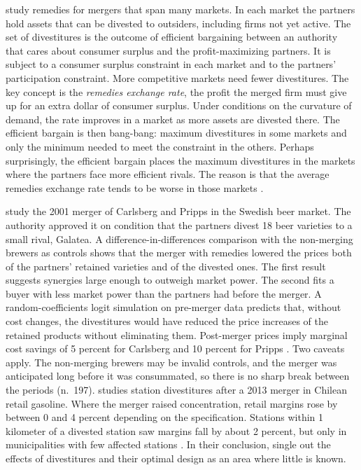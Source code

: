 \citet{NockeRhodes2019} study remedies for mergers that span many markets. In each market the partners hold assets
that can be divested to outsiders, including firms not yet active. The set of divestitures is the outcome of efficient
bargaining between an authority that cares about consumer surplus and the profit-maximizing partners. It is subject to
a consumer surplus constraint in each market and to the partners' participation constraint. More competitive markets
need fewer divestitures. The key concept is the \emph{remedies exchange rate}, the profit the merged firm must give up
for an extra dollar of consumer surplus. Under conditions on the curvature of demand, the rate improves in a market as
more assets are divested there. The efficient bargain is then bang-bang: maximum divestitures in some markets and only
the minimum needed to meet the constraint in the others. Perhaps surprisingly, the efficient bargain places the
maximum divestitures in the markets where the partners face more efficient rivals. The reason is that the average
remedies exchange rate tends to be worse in those markets \citep[p.~254]{AskerNocke2021}.

\citet{FribergRomahn2015} study the 2001 merger of Carlsberg and Pripps in the Swedish beer market. The authority
approved it on condition that the partners divest 18 beer varieties to a small rival, Galatea. A
difference-in-differences comparison with the non-merging brewers as controls shows that the merger with remedies
lowered the prices both of the partners' retained varieties and of the divested ones. The first result suggests
synergies large enough to outweigh market power. The second fits a buyer with less market power than the partners had
before the merger. A random-coefficients logit simulation on pre-merger data predicts that, without cost changes, the
divestitures would have reduced the price increases of the retained products without eliminating them. Post-merger
prices imply marginal cost savings of 5 percent for Carlsberg and 10 percent for Pripps \citep[p.~255]{AskerNocke2021}.
Two caveats apply. The non-merging brewers may be invalid controls, and the merger was anticipated long before it was
consummated, so there is no sharp break between the periods (n.~197). \citet{Lagos2018} studies station divestitures
after a 2013 merger in Chilean retail gasoline. Where the merger raised concentration, retail margins rose by between
0 and 4 percent depending on the specification. Stations within 1 kilometer of a divested station saw margins fall by
about 2 percent, but only in municipalities with few affected stations \citep[p.~263]{AskerNocke2021}. In their
conclusion, \citet[p.~261]{AskerNocke2021} single out the effects of divestitures and their optimal design as an area
where little is known.

